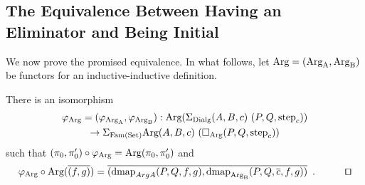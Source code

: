 \documentclass[orivec,envcountsame, ,envcountsect]{llncs}
\begin{document}
\subsection{The Equivalence Between Having an Eliminator and Being Initial}
\label{sec:elim-init-equiv}

We now prove the promised equivalence. In what follows, let $\text{Arg} = (\text{Arg}_{\text{A}},
\text{Arg}_{\text{B}})$ be functors for an inductive-inductive definition.

\begin{lemma}
\label{thm:isoArgAB}
  There is an isomorphism
\begin{multline*}
\varphi_{\ArgB} = (\varphi_{\ArgA}, \varphi_{\ArgBpp}) : \ArgB(\SigmaDialg (A, B, c)\ (P, Q, \stepind{c})) \\
  \to \SigmaFAM \ArgB(A, B, c)\ (\BOX_{\ArgB}(P, Q, \stepind{c})) %
\end{multline*}
such that $(\pi_0, \pi'_0) \circ \varphi_{\text{Arg}} =
\text{Arg}(\pi_0, \pi'_0)$ and
\[
\varphi_{\ArgB} \circ\ArgB(\CwFsect{(f, g)})
 = \CwFsect{(\dmap_{ArgA}(P, Q, f, g), \dmap_{\ArgBpp}(P, Q, \overline{c}, f, g))} \enspace .
\tag*{\qed}
\]
\end{lemma}
\end{document}
